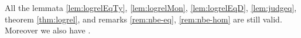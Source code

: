 \documentclass{LMCS}
\newcommand{\LONGVERSION}[1]{}
\newcommand{\SHORTVERSION}[1]{#1}
\newcommand{\LONGSHORT}[2]{\LONGVERSION{#1}\SHORTVERSION{#2}}
\begin{document}
\LONGSHORT{
  






















  \begin{rem}\hfill
    \begin{enumerate}[(1)]
    \item ;
    \item ;
    \item .
    \item .
    \end{enumerate}
  \end{rem}
}{
  \begin{rem}
    All the lemmata \ref{lem:logrelEqTy}, \ref{lem:logrelMon},
    \ref{lem:logrelEqD}, \ref{lem:judgeq}, theorem \ref{thm:logrel},
    and remarks \ref{rem:nbe-eq}, \ref{rem:nbe-hom} are still
    valid. Moreover we also have .
  \end{rem}
}

\LONGVERSION{
\begin{cor}
  If , then
  , and .
\end{cor}
}
\end{document}
